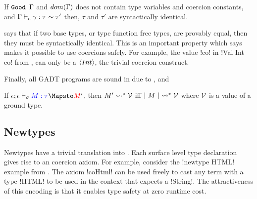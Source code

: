 \documentclass[screen,nonacm,manuscript,review]{acmart} %
\begin{document}
\begin{theorem}\label{thm:gadt-consistency}
 If $\texttt{Good~}\Gamma$ and $dom(\Gamma)$ does not contain type variables and coercion
 constants, and $\Gamma \vdash_{c} \gamma : \tau\sim\tau'$
 then, $\tau$ and $\tau'$ are syntactically identical.
\end{theorem}
 says that if two base types, or type
function free types, are provably equal, then they must be
syntactically identical. This is an important property which says makes
it possible to use coercions safely. For example, the value !co!
in !Val Int co! from , can only be a $\langle{Int}\rangle$, the
trivial coercion construct.

Finally, all GADT programs are sound in \SFC due to ,
 and 
\begin{corollary}
 If $\GTranslate \empt \empt \Tm \tau \Tm'$, then $M' \rightsquigarrow^* \mathcal{V}$ iff $|~{M}~| \rightsquigarrow^* \mathcal{V}$ where $\mathcal{V}$ is a
 value of a ground type.
\end{corollary}

\subsection{Newtypes}\label{sec:fc-encodes-newtypes}
Newtypes have a trivial translation into
\SFC. Each surface level type declaration gives rise to an coercion
axiom. For example, consider the !newtype HTML! example from
.
The axiom !coHtml! can be used freely to cast any term with a type
!HTML! to be used in the context that expects a !String!. The
attractiveness of this encoding is that it enables type safety at zero
runtime cost.
\end{document}
